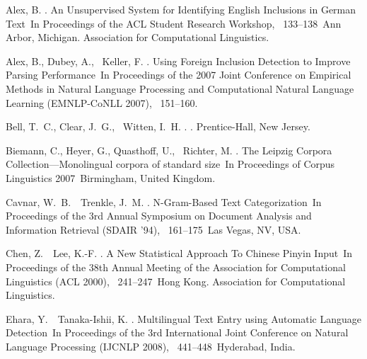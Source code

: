 \documentclass[japanese]{jnlp_1.4}
\begin{document}

\begin{thebibliography}{}

Alex, B. \BBCP.
\newblock \BBOQ An Unsupervised System for Identifying {E}nglish Inclusions in
  {G}erman Text\BBCQ\
\newblock In {\Bem Proceedings of the ACL Student Research Workshop},
  \mbox{\BPGS\ 133--138}\ Ann Arbor, Michigan. Association for Computational
  Linguistics.

Alex, B., Dubey, A., \BBA\ Keller, F. \BBOP 2007\BBCP.
\newblock \BBOQ Using Foreign Inclusion Detection to Improve Parsing
  Performance\BBCQ\
\newblock In {\Bem Proceedings of the 2007 Joint Conference on Empirical
  Methods in Natural Language Processing and Computational Natural Language
  Learning (EMNLP-CoNLL 2007)}, \mbox{\BPGS\ 151--160}.

Bell, T.~C., Clear, J.~G., \BBA\ Witten, I.~H. \BBCP.
\newblock {\Bem Text Compression}.
\newblock Prentice-Hall, New Jersey.

Biemann, C., Heyer, G., Quasthoff, U., \BBA\ Richter, M. \BBOP 2007\BBCP.
\newblock \BBOQ The {L}eipzig Corpora Collection---Monolingual corpora of
  standard size\BBCQ\
\newblock In {\Bem Proceedings of Corpus Linguistics 2007}\ Birmingham, United
  Kingdom.

Cavnar, W.~B.\BBACOMMA\ \BBA\ Trenkle, J.~M. \BBCP.
\newblock \BBOQ N-Gram-Based Text Categorization\BBCQ\
\newblock In {\Bem Proceedings of the 3rd Annual Symposium on Document Analysis
  and Information Retrieval (SDAIR '94)}, \mbox{\BPGS\ 161--175}\ Las Vegas,
  NV, USA.

Chen, Z.\BBACOMMA\ \BBA\ Lee, K.-F. \BBOP 2000\BBCP.
\newblock \BBOQ A New Statistical Approach To {C}hinese Pinyin Input\BBCQ\
\newblock In {\Bem Proceedings of the 38th Annual Meeting of the Association
  for Computational Linguistics (ACL 2000)}, \mbox{\BPGS\ 241--247}\ Hong Kong.
  Association for Computational Linguistics.

Ehara, Y.\BBACOMMA\ \BBA\ Tanaka-Ishii, K. \BBOP 2008\BBCP.
\newblock \BBOQ Multilingual Text Entry using Automatic Language
  Detection\BBCQ\
\newblock In {\Bem Proceedings of the 3rd International Joint Conference on
  Natural Language Processing (IJCNLP 2008)}, \mbox{\BPGS\ 441--448}\
  Hyderabad, India.


\end{thebibliography}
\end{document}
